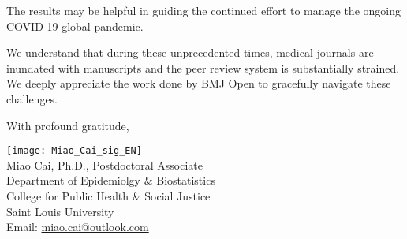 \documentclass[11pt, a4paper]{article}
\begin{document}
The results may be helpful in guiding the continued effort to manage the ongoing COVID-19 global pandemic. 

We understand that during these unprecedented times, medical journals are inundated with manuscripts and the peer review system is substantially strained. We deeply appreciate the work done by BMJ Open to gracefully navigate these challenges.


\vspace*{\fill}
With profound gratitude,



\begin{minipage}[c]{0.7\linewidth}
\texttt{[image: Miao\_Cai\_sig\_EN]}\\
Miao Cai, Ph.D., Postdoctoral Associate\\
Department of Epidemiolgy \& Biostatistics\\
College for Public Health \& Social Justice\\
Saint Louis University\\
Email: \href{mailto:miao.cai@outlook.com}{miao.cai@outlook.com}
\end{minipage}
\hfill
\begin{minipage}[c]{0.3\linewidth}
\end{minipage}
\end{document}
